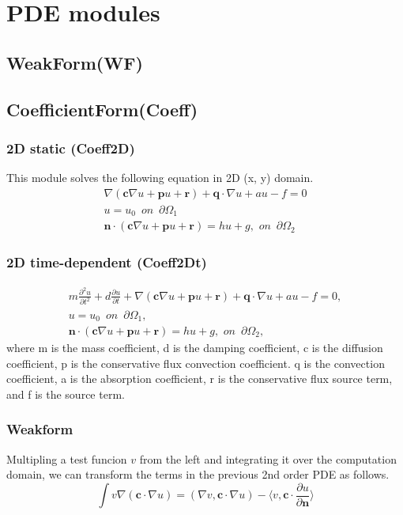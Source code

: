 \documentclass[11pt,a4paper,draft]{report}
\begin{document}
\chapter{PDE modules}
\section{WeakForm(WF)}
\section{CoefficientForm(Coeff)}
\subsection{2D static (Coeff2D)}
This module solves the following equation in 2D (x, y) domain.
  \begin{align}
   \nabla (\mathbf{c} \nabla u + \mathbf{p}u + \mathbf{r}) + \mathbf{q} \cdot \nabla u + au - f = 0 
  \\  
  u = u_{0} \,\,\,on\,\,\,\partial \Omega_{1}
  \\
 \mathbf{n}\cdot (\mathbf{c} \nabla u + \mathbf{p}u + \mathbf{r}) = hu + g,\,\,on\,\,\,\partial \Omega_{2}
  \end{align}
  
 

 
  \subsection{2D time-dependent (Coeff2Dt)}
  \begin{align}
  m\frac{\partial^2 u}{\partial t^2} +   d\frac{\partial u}{\partial t} + \nabla (\mathbf{c} \nabla u + \mathbf{p}u + \mathbf{r}) + \mathbf{q} \cdot \nabla u + au - f = 0, 
  \\  
  u = u_{0} \,\,\,on\,\,\,\partial \Omega_{1},
  \\
 \mathbf{n}\cdot (\mathbf{c} \nabla u + \mathbf{p}u + \mathbf{r}) = hu + g,\,\,on\,\,\,\partial \Omega_{2},
  \end{align}
where m is the mass coefficient, d is the damping coefficient, c is the diffusion coefficient, p is the conservative flux convection coefficient. q is the convection coefficient,  a is the absorption coefficient, r is the conservative flux source term, and f is the source term.

 \subsection{Weakform}
  Multipling a test funcion $v$ from the left and integrating it over the computation domain,  we can transform the terms in the previous 2nd order PDE as follows.
  \begin{equation}
 \int v \nabla (\mathbf{c} \cdot \nabla u) = (\nabla v,\mathbf{c} \cdot \nabla u) - \langle v, \mathbf{c} \cdot \frac{\partial u}{\partial \mathbf{n}} \rangle
  \end{equation}
  
\end{document}
